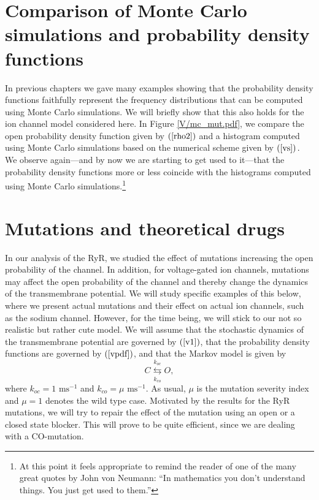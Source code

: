 \section[Comparison of MCs and PDFs]{Comparison of Monte Carlo simulations and probability density functions}


In previous chapters we gave many examples showing that the probability density
functions faithfully represent the frequency distributions that can be
computed using Monte Carlo simulations. We will briefly show that this also
holds for the ion channel model considered here. In Figure \ref{V/mc_mut.pdf}, we compare the
open probability density function given by $\left(  \ref{rho2}\right)  $ and a
histogram computed using Monte Carlo simulations based on the numerical scheme
given by $\left(  \ref{vs}\right)  .$  We observe again---and by now we are starting to get used to it---that the probability density functions 
more or less coincide with the histograms computed using Monte Carlo simulations.\footnote{At this point
it feels appropriate to remind the reader of one of the many great quotes by John von Neumann: 
{``In mathematics you don't understand things. You just get used to them.''}
}



\section{Mutations and theoretical drugs}

In our analysis of the RyR, we studied the effect of mutations increasing the 
open probability of the channel. In addition, for voltage-gated ion
channels, mutations may affect the open probability of the channel and thereby
change the dynamics of the transmembrane potential. We will study specific
examples of this below, where we present actual mutations and their effect on
actual ion channels, such as the sodium channel. However, for the time being,
we will stick to our not so realistic but rather cute model. We will assume 
that the stochastic dynamics of the transmembrane potential are governed by 
$\left(\ref{v1}\right)$,  that the probability density functions are governed by
$\left(  \ref{vpdf}\right)$, and that the Markov model is given by%
\begin{equation}
C\underset{k_{co}}{\overset{k_{oc}}{\leftrightarrows}}O,
\end{equation}
where $k_{oc}=1 \text{ ms}^{-1}$ and $k_{co}=\mu\text{ ms}^{-1}.$ 
As usual,  $\mu$ is the mutation severity
index and $\mu=1$ denotes the wild type case. 
Motivated by the results for the RyR mutations,
we will try to repair the effect of the mutation using an open or a closed
state blocker. This will prove to be quite efficient, since we are dealing with a CO-mutation.

